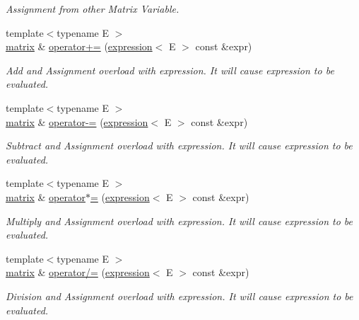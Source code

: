 \begin{DoxyCompactItemize}
\begin{DoxyCompactList}\small\item\em Assignment from other Matrix Variable. \end{DoxyCompactList}\item 
{\footnotesize template$<$typename E $>$ }\\\mbox{\hyperlink{classtest_1_1matrix}{matrix}} \& \mbox{\hyperlink{classtest_1_1matrix_acacdf5c7f4c7c687691b8daf03d1821d}{operator+=}} (\mbox{\hyperlink{classtest_1_1expression}{expression}}$<$ E $>$ const \&expr)
\begin{DoxyCompactList}\small\item\em Add and Assignment overload with expression. It will cause expression to be evaluated. \end{DoxyCompactList}\item 
{\footnotesize template$<$typename E $>$ }\\\mbox{\hyperlink{classtest_1_1matrix}{matrix}} \& \mbox{\hyperlink{classtest_1_1matrix_a3bc463949a4ca9267e6ca9c23fabb9e8}{operator-\/=}} (\mbox{\hyperlink{classtest_1_1expression}{expression}}$<$ E $>$ const \&expr)
\begin{DoxyCompactList}\small\item\em Subtract and Assignment overload with expression. It will cause expression to be evaluated. \end{DoxyCompactList}\item 
{\footnotesize template$<$typename E $>$ }\\\mbox{\hyperlink{classtest_1_1matrix}{matrix}} \& \mbox{\hyperlink{classtest_1_1matrix_a693b7a5396ba6a51342a525cb6738be1}{operator$\ast$=}} (\mbox{\hyperlink{classtest_1_1expression}{expression}}$<$ E $>$ const \&expr)
\begin{DoxyCompactList}\small\item\em Multiply and Assignment overload with expression. It will cause expression to be evaluated. \end{DoxyCompactList}\item 
{\footnotesize template$<$typename E $>$ }\\\mbox{\hyperlink{classtest_1_1matrix}{matrix}} \& \mbox{\hyperlink{classtest_1_1matrix_af775ea504d511a5bd706c510b428a832}{operator/=}} (\mbox{\hyperlink{classtest_1_1expression}{expression}}$<$ E $>$ const \&expr)
\begin{DoxyCompactList}\small\item\em Division and Assignment overload with expression. It will cause expression to be evaluated. \end{DoxyCompactList}\item 

\end{DoxyCompactItemize}
